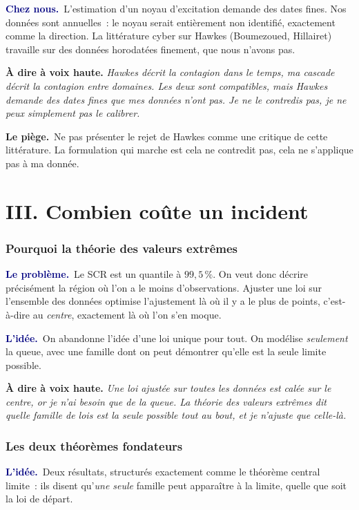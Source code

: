 \documentclass[11pt,a4paper]{article}
\newcommand{\lequoi}[1]{\smallskip\noindent\textcolor{navy}{\textbf{Le problème.}}\ #1\par}
\newcommand{\lidee}[1]{\smallskip\noindent\textcolor{navy}{\textbf{L'idée.}}\ #1\par}
\newcommand{\cheznous}[1]{\smallskip\noindent\textcolor{navy}{\textbf{Chez nous.}}\ #1\par}
\newcommand{\lepiege}[1]{\smallskip\noindent\textcolor{accent}{\textbf{Le piège.}}\ #1\par}
\newcommand{\laphrase}[1]{\begin{phrasebox}\textbf{À dire à voix haute.} \emph{#1}\end{phrasebox}}
\begin{document}
\cheznous{L'estimation d'un noyau d'excitation demande des dates fines. Nos données sont
annuelles~: le noyau serait entièrement non identifié, exactement comme la direction. La
littérature cyber sur Hawkes (Boumezoued, Hillairet) travaille sur des données horodatées
finement, que nous n'avons pas.}

\laphrase{Hawkes décrit la contagion dans le temps, ma cascade décrit la contagion entre
domaines. Les deux sont compatibles, mais Hawkes demande des dates fines que mes données
n'ont pas. Je ne le contredis pas, je ne peux simplement pas le calibrer.}

\lepiege{Ne pas présenter le rejet de Hawkes comme une critique de cette littérature. La
formulation qui marche est \og cela ne contredit pas, cela ne s'applique pas à ma donnée\fg{}.}

\part*{III. Combien coûte un incident}

\section{Pourquoi la théorie des valeurs extrêmes}

\lequoi{Le SCR est un quantile à $99{,}5\,\%$. On veut donc décrire précisément la région
où l'on a le moins d'observations. Ajuster une loi sur l'ensemble des données optimise
l'ajustement là où il y a le plus de points, c'est-à-dire au \emph{centre}, exactement là
où l'on s'en moque.}

\lidee{On abandonne l'idée d'une loi unique pour tout. On modélise \emph{seulement} la
queue, avec une famille dont on peut démontrer qu'elle est la seule limite possible.}

\laphrase{Une loi ajustée sur toutes les données est calée sur le centre, or je n'ai besoin
que de la queue. La théorie des valeurs extrêmes dit quelle famille de lois est la seule
possible tout au bout, et je n'ajuste que celle-là.}

\section{Les deux théorèmes fondateurs}

\lidee{Deux résultats, structurés exactement comme le théorème central limite~: ils disent
qu'\emph{une seule} famille peut apparaître à la limite, quelle que soit la loi de départ.}
\end{document}
